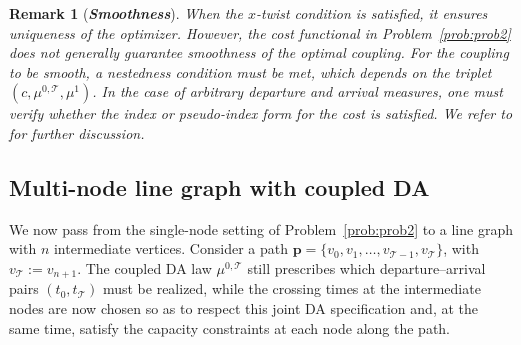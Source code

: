 \documentclass[11pt]{article}
\newcommand{\calT}{{\mathcal T}}
\newtheorem{remark}{Remark}
\begin{document}
\begin{remark}[\bf \textit{Smoothness}]\label{remark:smooth}
When the $x$-twist condition is satisfied, it ensures uniqueness of the optimizer. However, the cost functional in Problem~\ref{prob:prob2} does not generally guarantee smoothness of the optimal coupling. For the coupling to be smooth, a nestedness condition must be met, which depends on the triplet $(c, \mu^{0,\calT}, \mu^1)$. In the case of arbitrary departure and arrival measures, one must verify whether the index or pseudo-index form for the cost is satisfied. We refer to \cite{dong2025task,chiappori2020multidimensional} for further discussion.
\end{remark}


\subsection{Multi-node line graph with coupled DA}

We now pass from the single-node setting of Problem~\ref{prob:prob2} to a line graph with $n$ intermediate vertices. Consider a path $\mathbf{p} = \{v_0,v_1,\dots,v_{\calT-1},v_{\calT}\}$, with $v_{\calT}:=v_{n+1}$. The coupled DA law $\mu^{0,\calT}$ still prescribes which departure–arrival pairs $(t_0,t_{\calT})$ must be realized, while the crossing times at the intermediate nodes are now chosen so as to respect this joint DA specification and, at the same time, satisfy the capacity constraints at each node along the path.
\end{document}
